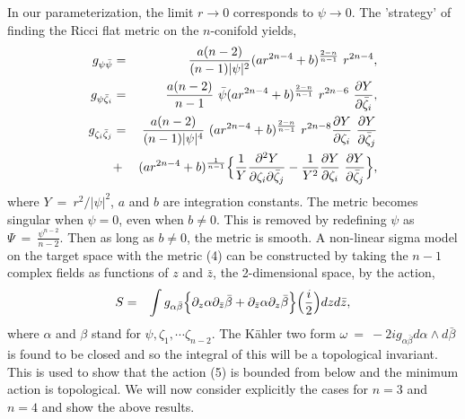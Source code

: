 \documentclass[a4paper,12pt]{article}
\begin{document}
{In our parameterization, the limit $r \rightarrow 0$ 
corresponds to $\psi \rightarrow 0$. The 'strategy' of finding the Ricci 
flat metric on the $n$-conifold yields,
\begin{eqnarray}
g_{\psi\bar{\psi}}&=&\frac{a(n-2)}{(n-1)|\psi |^2} (ar^{2n-4}+b)^{\frac
{2-n}{n-1}}\ r^{2n-4}, \nonumber \\
g_{\psi {\bar{\zeta}}_i}&=&\frac{a(n-2)}{n-1}\ {\bar{\psi}} (ar^{2n-4} 
+b)^{\frac{2-n}{n-1}}\ r^{2n-6}\ \frac{\partial Y}{\partial {\bar{\zeta}}
_i}, \nonumber \\
g_{{\zeta}_i{\bar{\zeta}}_j}&=&\frac{a(n-2)}{(n-1)|\psi|^4}\ (ar^{2n-4} 
+b)^{\frac{2-n}{n-1}}\ r^{2n-8} \frac{\partial Y}{\partial {\zeta}_i} 
\ \frac{\partial Y}{\partial {\bar{\zeta}}_j} \nonumber \\
&+& (ar^{2n-4}+b)^{\frac{1}{n-1}}\Bigl\{ \frac{1}{Y}\frac{{\partial}^2Y}
{\partial {\zeta}_i \partial {\bar{\zeta}}_j} - \frac{1}{Y^2} \frac{
\partial Y}{\partial {\zeta}_i}\ \frac{\partial Y}{\partial {\bar{\zeta}}
_j} \Bigr\},
\end{eqnarray}
where $Y\ =\ r^2/{|\psi|^2}$, $a$ and $b$ are integration constants. The 
metric becomes singular when $\psi = 0$, even when $b \neq 0$. This is removed 
by redefining $\psi$ as $\Psi \ =\ \frac{{\psi}^{n-2}}{n-2}$. Then as long 
as $b \neq 0$, the metric is smooth. A non-linear sigma model on the target 
space with the metric (4) can be constructed by taking the $n-1$ complex 
fields as functions of $z$ and $\bar{z}$, the 2-dimensional space, by the 
action,
\begin{eqnarray}
S&=& \int g_{\alpha {\bar{\beta}}} \Bigl\{ {\partial}_z \alpha {\partial} 
_{\bar{z}}{\bar{\beta}}+{\partial}_{\bar{z}}\alpha {\partial}_z\bar{\beta}
\Bigr\} \Big( \frac{i}{2}\Big) dz d\bar{z},
\end{eqnarray}
where $\alpha$ and $\beta$ stand for $\psi, {\zeta}_1, \cdots {\zeta}_{n-2}$. 
The K\"{a}hler two form $\omega \ =\ -2i g_{\alpha \bar{\beta}} d\alpha 
\wedge d\bar{\beta}$ is found to be closed and so the integral of this 
will be a topological invariant. This is used to show that the action (5) is 
bounded from below and the minimum action is topological. We will now 
consider explicitly the cases for $n=3$ and $n=4$ and show the above results. 

\vspace{0.5cm}

{

\vspace{0.5cm}

}}
\end{document}
